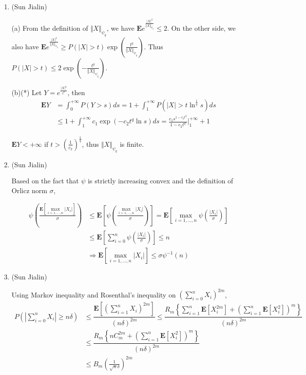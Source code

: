\begin{enumerate}
	\item
	(Sun Jialin)
	
	(a) From the definition of $ \Vert X \Vert_{\psi_{q}} $, we have $ \bm{E}e^{\frac{|X|^{2}}{\Vert X \Vert_{\psi_{q}}}} \leq 2 $. On the other side, we also have $ \bm{E}e^{\frac{|X|^{2}}{\Vert X \Vert_{\psi_{q}}}} \geq P(|X|>t)\exp(\frac{t^{q}}{\Vert X \Vert_{\psi_{q}}}) $. Thus $ P(|X|>t) \leq 2\exp(-\frac{t^{q}}{\Vert X \Vert_{\psi_{q}}}) $.
	
	(b)(*) Let $ Y=e^{\frac{|X|^{q}}{t^{q}}} $, then \[\begin{split} \bm{E}Y &= \int_{0}^{+\infty}P(Y>s)ds=1+\int_{1}^{+\infty}P(|X|>t\ln^{\frac{1}{q}}s)ds \\&
	\leq 1+\int_{1}^{+\infty}c_{1}\exp(-c_{2}t^{q}\ln s)ds = \frac{c_{1}s^{1-c_{2}t^{q}}}{1-c_{2}t^{q}}|^{+\infty}_{1}+1
	\end{split}\]
	
	$ \bm{E}Y<+\infty $ if $ t>(\frac{1}{c_{2}})^{\frac{1}{q}} $, thus $ \Vert X \Vert_{\psi_{q}} $ is finite.
	
	\item
	(Sun Jialin)
	
	Based on the fact that $ \psi $ is strictly increasing convex and the definition of Orlicz norm $ \sigma $,
	
	\[\begin{split}
	\psi \left (\frac{\bm{E}[\max \limits_{i=1,...,n} |X_{i}|]}{\sigma} \right ) & \leq \bm{E}\left [\psi \left (\frac{\max \limits_{i=1,...,n} |X_{i}|}{\sigma} \right )\right ] = \bm{E}\left [\max \limits_{i=1,...,n} \psi \left (\frac{|X_{i}|}{\sigma} \right ) \right ] \\& \leq \bm{E}\left [\sum_{i=0}^{n}\psi \left (\frac{|X_{i}|}{\sigma} \right ) \right ] \leq n \\& \Rightarrow \bm{E}\left [\max \limits_{i=1,...,n} |X_{i}| \right] \leq \sigma\psi^{-1}(n)
	\end{split}\]
	
	\item
	(Sun Jialin)
	
	Using Markov inequality and Rosenthal's inequality on $ (\sum_{i=0}^{n} X_{i})^{2m} $,
	\[\begin{split}
	P(|\sum_{i=0}^{n}X_{i}|\geq n\delta) & \leq \dfrac{\bm{E}\left[ (\sum_{i=1}^{n} X_{i})^{2m} \right]}{(n\delta)^{2m}}
	\leq \dfrac{R_{m} \left \{ \sum_{i=1}^{n}\bm{E}\left[ X^{2m}_{i} \right] + \left(\sum_{i=1}^{n}\bm{E}\left[X^{2}_{i}\right]\right)^{m} \right \}}{(n\delta)^{2m}} \\&
	\leq \dfrac{R_{m} \left \{ nC^{2m}_{m} + \left(\sum_{i=1}^{n}\bm{E}\left[X^{2}_{i}\right]\right)^{m} \right \}}{(n\delta)^{2m}} \\&
	\leq B_{m}\left(\frac{1}{\sqrt{n}\delta}\right)^{2m}
	\end{split}\]
	

\end{enumerate}
